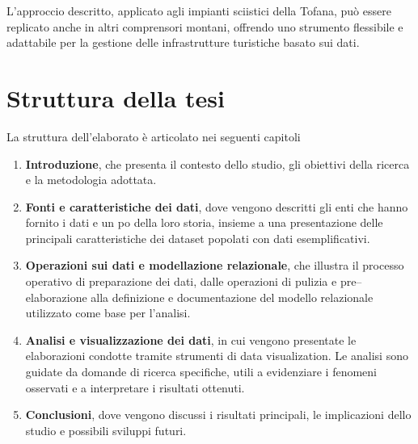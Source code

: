 L'approccio descritto, applicato agli impianti sciistici della Tofana, può essere replicato anche in altri comprensori montani, offrendo uno strumento flessibile e adattabile per la gestione delle infrastrutture turistiche basato sui dati.


\section{Struttura della tesi}

La struttura dell'elaborato è articolato nei seguenti capitoli

\begin{enumerate}
    \item \textbf{Introduzione}, che presenta il contesto dello studio, gli obiettivi della ricerca e la metodologia adottata.
    \item \textbf{Fonti e caratteristiche dei dati}, dove vengono descritti gli enti che hanno fornito i dati e un po della loro storia, insieme a una presentazione delle principali caratteristiche dei dataset popolati con dati esemplificativi.
    \item \textbf{Operazioni sui dati e modellazione relazionale}, che illustra il processo operativo di preparazione dei dati, dalle operazioni di pulizia e pre–elaborazione alla definizione e documentazione del modello relazionale utilizzato come base per l’analisi.
    \item \textbf{Analisi e visualizzazione dei dati}, in cui vengono presentate le elaborazioni condotte tramite strumenti di data visualization. Le analisi sono guidate da domande di ricerca specifiche, utili a evidenziare i fenomeni osservati e a interpretare i risultati ottenuti.
    \item \textbf{Conclusioni}, dove vengono discussi i risultati principali, le implicazioni dello studio e possibili sviluppi futuri.

\end{enumerate}




